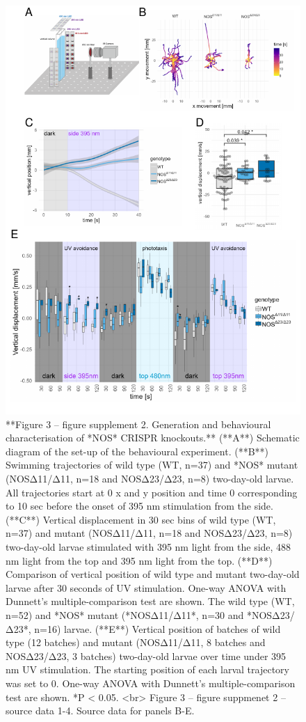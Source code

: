 \documentclass[
  10pt,
  onecolumn]{article}
\begin{document}
\begin{figure}
\includegraphics[width=18.06in]{figures/Fig3_sup2} \caption{**Figure 3 -- figure supplement 2. Generation and behavioural characterisation of *NOS* CRISPR knockouts.** (**A**) Schematic diagram of the set-up of the behavioural experiment. (**B**) Swimming trajectories of wild type (WT, n=37) and *NOS* mutant (NOSΔ11/Δ11, n=18 and NOSΔ23/Δ23, n=8) two-day-old larvae. All trajectories start at 0 x and y position and time 0 corresponding to 10 sec before the onset of 395 nm stimulation from the side. (**C**)  Vertical displacement in 30 sec bins of wild type (WT, n=37) and mutant (NOSΔ11/Δ11, n=18 and NOSΔ23/Δ23, n=8) two-day-old larvae stimulated with 395 nm light from the side, 488 nm light from the top and 395 nm light from the top. (**D**) Comparison of vertical position of wild type and mutant two-day-old larvae after 30 seconds of UV stimulation. One-way ANOVA with Dunnett’s multiple-comparison test are shown. The wild type (WT, n=52) and *NOS* mutant (*NOSΔ11/Δ11*, n=30 and *NOSΔ23/Δ23*, n=16) larvae. (**E**) Vertical position of batches of wild type (12 batches) and mutant (NOSΔ11/Δ11, 8 batches and NOSΔ23/Δ23, 3 batches) two-day-old larvae over time under 395 nm UV stimulation. The starting position of each larval trajectory was set to 0. One-way ANOVA with Dunnett’s multiple-comparison test are shown. *P < 0.05. <br> Figure 3 -- figure suppmenet 2 -- source data 1-4. Source data for panels B-E.}\label{fig:unnamed-chunk-14}
\end{figure}
\end{document}
